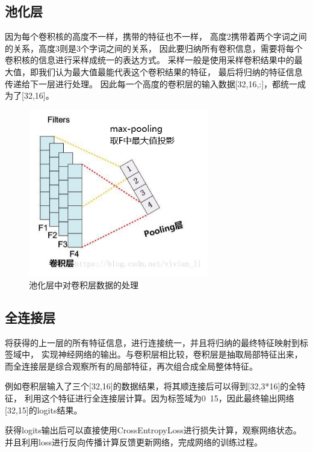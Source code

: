 \documentclass[11pt]{article}
\begin{document}
\begin{CJK*}{UTF8}{gbsn}
\subsection{池化层}
因为每个卷积核的高度不一样，携带的特征也不一样，
高度2携带着两个字词之间的关系，高度3则是3个字词之间的关系，
因此要归纳所有卷积信息，需要将每个卷积核的信息进行采样成统一的表达方式。
采样一般是使用采样卷积结果中的最大值，即我们认为最大值最能代表这个卷积结果的特征，
最后将归纳的特征信息传递给下一层进行处理。
因此每一个高度的卷积层的输入数据[32,16,:]，都统一成为了[32,16]。

\begin{figure}[H] %
\centering %
\includegraphics[width=0.7\textwidth]{pooling.jpg} %
\caption{池化层中对卷积层数据的处理} %
\label{Fig.main2} %
\end{figure}

\subsection{全连接层}
\label{ssec:first}
将获得的上一层的所有特征信息，进行连接统一，并且将归纳的最终特征映射到标签域中，
实现神经网络的输出。与卷积层相比较，卷积层是抽取局部特征出来，
而全连接层是综合观察所有的局部特征，再次组合成全局整体特征。

例如卷积层输入了三个[32,16]的数据结果，将其顺连接后可以得到[32,3*16]的全特征，
利用这个特征进行全连接层计算。因为标签域为0~15，因此最终输出网络[32,15]的logits结果。

获得logits输出后可以直接使用CrossEntropyLoss进行损失计算，观察网络状态。
并且利用loss进行反向传播计算反馈更新网络，完成网络的训练过程。


\end{CJK*}
\end{document}
